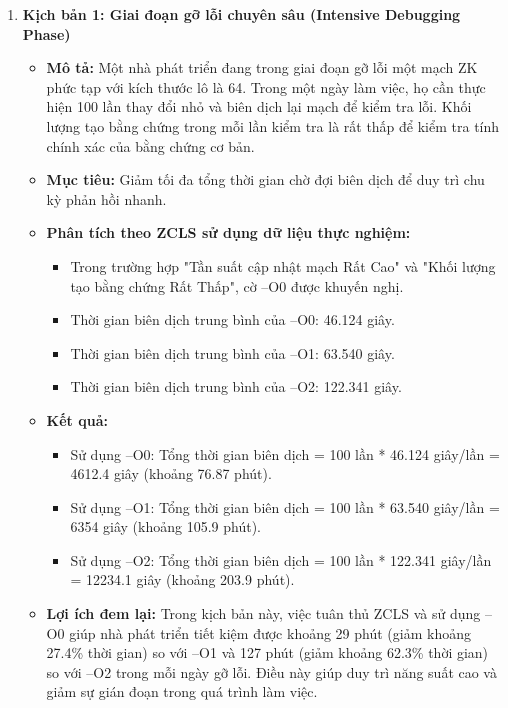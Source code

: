 \begin{enumerate}
    \item \textbf{Kịch bản 1: Giai đoạn gỡ lỗi chuyên sâu (Intensive Debugging Phase)}

    \begin{itemize}
    \item \textbf{Mô tả:} Một nhà phát triển đang trong giai đoạn gỡ lỗi một mạch ZK phức tạp với kích thước lô là 64. Trong một ngày làm việc, họ cần thực hiện 100 lần thay đổi nhỏ và biên dịch lại mạch để kiểm tra lỗi. Khối lượng tạo bằng chứng trong mỗi lần kiểm tra là rất thấp để kiểm tra tính chính xác của bằng chứng cơ bản.

    \item\textbf{Mục tiêu:} Giảm tối đa tổng thời gian chờ đợi biên dịch để duy trì chu kỳ phản hồi nhanh.

    \item\textbf{Phân tích theo ZCLS sử dụng dữ liệu thực nghiệm:}
    \begin{itemize}
    \item Trong trường hợp "Tần suất cập nhật mạch Rất Cao" và "Khối lượng tạo bằng chứng Rất Thấp", cờ --O0 được khuyến nghị.
    \item Thời gian biên dịch trung bình của --O0: 46.124 giây.
    \item Thời gian biên dịch trung bình của --O1: 63.540 giây.
    \item Thời gian biên dịch trung bình của --O2: 122.341 giây.
    \end{itemize}

    \item\textbf{Kết quả:}
    \begin{itemize}
    \item Sử dụng --O0: Tổng thời gian biên dịch = 100 lần * 46.124 giây/lần = 4612.4 giây (khoảng 76.87 phút).
    \item Sử dụng --O1: Tổng thời gian biên dịch = 100 lần * 63.540 giây/lần = 6354 giây (khoảng 105.9 phút).
    \item Sử dụng --O2: Tổng thời gian biên dịch = 100 lần * 122.341 giây/lần = 12234.1 giây (khoảng 203.9 phút).
    \end{itemize}

    \item\textbf{Lợi ích đem lại:} Trong kịch bản này, việc tuân thủ ZCLS và sử dụng --O0 giúp nhà phát triển tiết kiệm được khoảng 29 phút (giảm khoảng 27.4\% thời gian) so với --O1 và 127 phút (giảm khoảng 62.3\% thời gian) so với --O2 trong mỗi ngày gỡ lỗi. Điều này giúp duy trì năng suất cao và giảm sự gián đoạn trong quá trình làm việc.


\end{itemize}
\end{enumerate}
